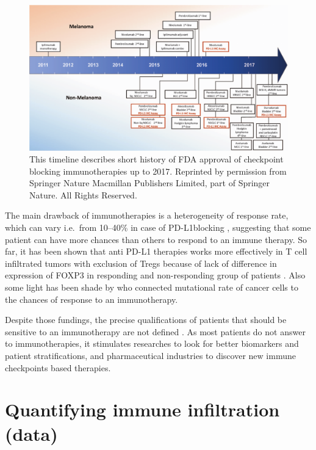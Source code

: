 \documentclass[12pt,]{book}
\theoremstyle{definition}
\theoremstyle{definition}
\theoremstyle{definition}
\theoremstyle{remark}
\begin{document}
\begin{figure}

{\centering \includegraphics[width=1\linewidth]{figures-ext/02-timeline-immunotherapies} 

}

\caption{This timeline describes short
history of FDA approval of checkpoint blocking immunotherapies up to
2017. Reprinted by permission from Springer Nature \citep{Taube2017a}
Macmillan Publishers Limited, part of Springer Nature. All Rights
Reserved.}\label{fig:timeline-immunotherapies}
\end{figure}







The main drawback of immunotherapies is a heterogeneity of response
rate, which can vary i.e.~from 10--40\% in case of PD-L1blocking
\citep{Zou2016}, suggesting that some patient can have more chances than
others to respond to an immune therapy. So far, it has been shown that
anti PD-L1 therapies works more effectively in T cell infiltrated tumors
with exclusion of Tregs because of lack of difference in expression of
FOXP3 in responding and non-responding group of patients
\citep{Herbst2014}. Also some light has been shade by \citet{Rizvi2015}
who connected mutational rate of cancer cells to the chances of response
to an immunotherapy.

Despite those fundings, the precise qualifications of patients that
should be sensitive to an immunotherapy are not defined
\citep{Pitt2016}. As most patients do not answer to immunotherapies, it
stimulates researches to look for better biomarkers and patient
stratifications, and pharmaceutical industries to discover new immune
checkpoints based therapies.

\hypertarget{quantifying-immune-infiltration-data}{%
\section{Quantifying immune infiltration
(data)}\label{quantifying-immune-infiltration-data}}
\end{document}
